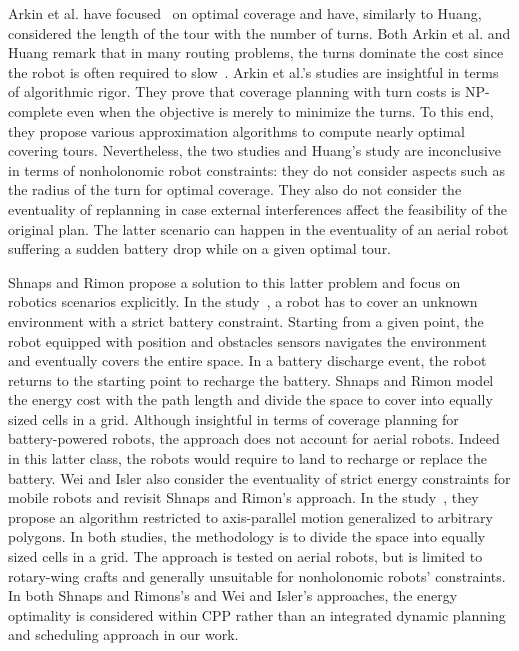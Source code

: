 Arkin et al. have focused~\citep{arkin2001optimal,arkin2005optimal} on optimal coverage and have, similarly to Huang, considered the length of the tour with the number of turns. Both Arkin et al. and Huang remark that in many routing problems, the turns dominate the cost since the robot is often required to slow~\citep{arkin2001optimal}. Arkin et al.'s studies are insightful in terms of algorithmic rigor. They prove that coverage planning with turn costs is NP-complete even when the objective is merely to minimize the turns. To this end, they propose various approximation algorithms to compute nearly optimal covering tours. Nevertheless, the two studies and Huang's study are inconclusive in terms of nonholonomic robot constraints: they do not consider aspects such as the radius of the turn for optimal coverage. They also do not consider the eventuality of replanning in case external interferences affect the feasibility of the original plan. The latter scenario can happen in the eventuality of an aerial robot suffering a sudden battery drop while on a given optimal tour.

Shnaps and Rimon propose a solution to this latter problem and focus on robotics scenarios explicitly. In the study~\citep{shnaps2016online}, a robot has to cover an unknown environment with a strict battery constraint. Starting from a given point, the robot equipped with position and obstacles sensors navigates the environment and eventually covers the entire space. In a battery discharge event, the robot returns to the starting point to recharge the battery. Shnaps and Rimon model the energy cost with the path length and divide the space to cover into equally sized cells in a grid. Although insightful in terms of coverage planning for battery-powered robots, the approach does not account for aerial robots. Indeed in this latter class, the robots would require to land to recharge or replace the battery. Wei and Isler also consider the eventuality of strict energy constraints for mobile robots and revisit Shnaps and Rimon's approach. In the study~\citep{wei2018coverage}, they propose an algorithm restricted to axis-parallel motion generalized to arbitrary polygons. In both studies, the methodology is to divide the space into equally sized cells in a grid. The approach is tested on aerial robots, but is limited to rotary-wing crafts and generally unsuitable for nonholonomic robots' constraints. In both Shnaps and Rimons's and Wei and Isler's approaches, the energy optimality is considered within CPP rather than an integrated dynamic planning and scheduling approach in our work.

